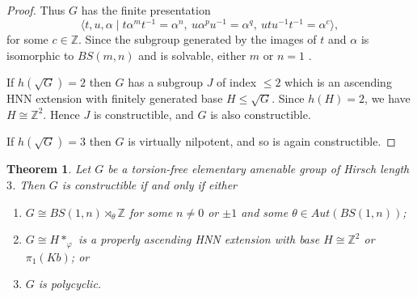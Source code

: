 \documentclass[12pt]{amsart}
\renewcommand{\leq}{\leqslant}
\newtheorem{theorem}{Theorem}
\begin{document}
\begin{proof}
Thus $G$ has the finite presentation
\[
\langle{t,u,\alpha}\mid {t\alpha^mt^{-1}=\alpha^n},~u\alpha^pu^{-1}=\alpha^q,
~utu^{-1}t^{-1}=\alpha^c\rangle,
\]
for some $c\in\mathbb{Z}$.
Since the subgroup generated by the images of $t$ and $\alpha$ is
isomorphic to $BS(m,n)$ and is solvable, either $m$ or $n=1$ \cite{BS78}.

If $h(\sqrt{G})=2$ then $G$ has a subgroup $J$ of index $\leq2$
which is an ascending HNN extension with finitely generated base 
$H\leq{\sqrt{G}}$.
Since $h(H)=2$, we have $H\cong\mathbb{Z}^2$.
Hence  $J$ is constructible, and $G$ is also constructible.

If $h(\sqrt{G})=3$ then $G$ is virtually nilpotent,
and so is again constructible.
\end{proof}

\begin{theorem}
\label{list constructible}
Let $G$ be a torsion-free elementary amenable group of Hirsch length $3$.
Then $G$ is constructible if and only if either
\begin{enumerate}
\item$G\cong{BS(1,n)\rtimes_\theta\mathbb{Z}}$ for some 
$n\not=0$ or $\pm1$  and some $\theta\in{Aut(BS(1,n))}$;
\item$G\cong{H}*_\varphi$ is a properly ascending HNN extension with base 
$H\cong\mathbb{Z}^2$ or $\pi_1(Kb)$; or
\item$G$ is polycyclic.
\end{enumerate}
\end{theorem}
\end{document}
